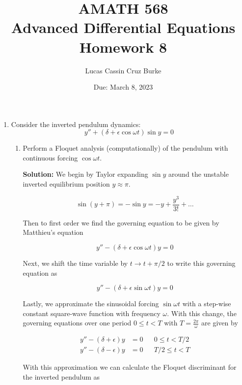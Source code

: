 \documentclass[12pt, a4paper]{article}
\begin{document}
\title{{AMATH 568\\
Advanced Differential Equations}\\
{\bf \Huge Homework 8}}

\author{Lucas Cassin Cruz Burke}

\date{Due: March 8, 2023}

\maketitle

\begin{enumerate}
    \item Consider the inverted pendulum dynamics: $$y'' + (\delta + \epsilon \cos \omega t) \sin y = 0$$
    
    \begin{enumerate}
        \item Perform a Floquet analysis (computationally) of the pendulum with continuous forcing $\cos \omega t$. 
        
        \textbf{Solution:} We begin by Taylor expanding $\sin y$ around the unstable inverted equilibrium position $y \approx \pi$. 
        
        $$\sin(y+\pi) = -\sin y = -y + \frac{y^3}{3!} + \dots$$

        Then to first order we find the governing equation to be given by Matthieu's equation

        $$y'' - (\delta + \epsilon \cos \omega t)y=0$$

        Next, we shift the time variable by $t \rightarrow t + \pi/2$ to write this governing equation as 

        $$y'' - (\delta + \epsilon \sin \omega t)y=0$$

        Lastly, we approximate the sinusoidal forcing $\sin \omega t$ with a step-wise constant square-wave function with frequency $\omega$. With this change, the governing equations over one period $0 \le t <T$ with $T = \frac{2\pi}{\omega}$ are given by 

        \begin{align*}
            y'' - (\delta + \epsilon)y &= 0 && 0 \le t < T/2 \\
            y'' - (\delta - \epsilon) y &= 0 && T/2 \le t < T
        \end{align*}

        With this approximation we can calculate the Floquet discriminant for the inverted pendulum as 


\end{enumerate}
\end{enumerate}
\end{document}
